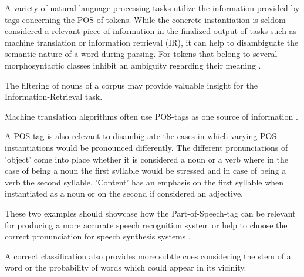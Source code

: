 A variety of natural language processing tasks utilize the information provided by tags concerning the POS of tokens. 
While the concrete instantiation is seldom considered a relevant piece of information in the finalized output of tasks such as machine translation or information retrieval (IR), it can help to disambiguate the semantic nature of a word during parsing. 
For tokens that belong to several morphosyntactic classes inhibit an ambiguity regarding their meaning \citep{embedding2020pilehvar}.

The filtering of nouns of a corpus may provide valuable insight for the Information-Retrieval task. 

Machine translation algorithms often use POS-tags as one source of information \citep{westpfahl2020pos}.

A POS-tag is also relevant to disambiguate the cases in which varying POS-instantiations would be pronounced differently. 
The different pronunciations of 'object' come into place whether it is considered a noun or a verb where in the case of being a noun the first syllable would be stressed and in case of being a verb the second syllable.
'Content' has an emphasis on the first syllable when instantiated as a noun or on the second if considered an adjective. 

These two examples should showcase how the Part-of-Speech-tag can be relevant for producing a more accurate speech recognition system or help to choose the correct pronunciation for speech synthesis systems \citep{jurafsky2021}. 

A correct classification also provides more subtle cues considering the stem of a word or the probability of words which could appear in its vicinity.
